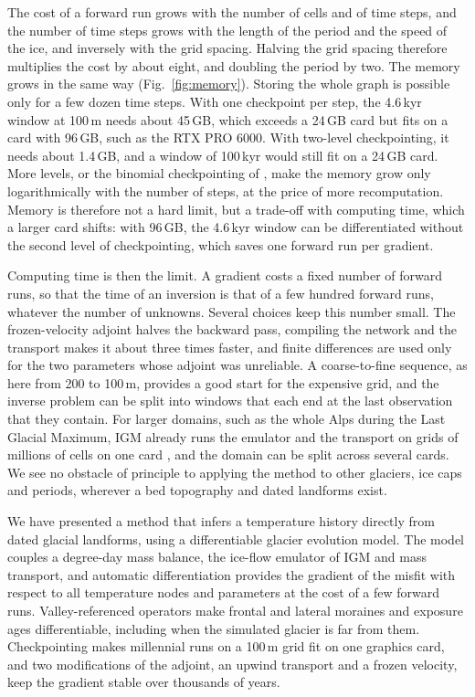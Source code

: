 \documentclass[tc, manuscript]{copernicus}
\begin{document}
The cost of a forward run grows with the number of cells and of time steps, and the number of time steps grows with the length of the period and the speed of the ice, and inversely with the grid spacing. Halving the grid spacing therefore multiplies the cost by about eight, and doubling the period by two. The memory grows in the same way (Fig.~\ref{fig:memory}). Storing the whole graph is possible only for a few dozen time steps. With one checkpoint per step, the 4.6\,kyr window at 100\,m needs about 45\,GB, which exceeds a 24\,GB card but fits on a card with 96\,GB, such as the RTX PRO 6000. With two-level checkpointing, it needs about 1.4\,GB, and a window of 100\,kyr would still fit on a 24\,GB card. More levels, or the binomial checkpointing of \citet{griewank2000}, make the memory grow only logarithmically with the number of steps, at the price of more recomputation. Memory is therefore not a hard limit, but a trade-off with computing time, which a larger card shifts: with 96\,GB, the 4.6\,kyr window can be differentiated without the second level of checkpointing, which saves one forward run per gradient.

Computing time is then the limit. A gradient costs a fixed number of forward runs, so that the time of an inversion is that of a few hundred forward runs, whatever the number of unknowns. Several choices keep this number small. The frozen-velocity adjoint halves the backward pass, compiling the network and the transport makes it about three times faster, and finite differences are used only for the two parameters whose adjoint was unreliable. A coarse-to-fine sequence, as here from 200 to 100\,m, provides a good start for the expensive grid, and the inverse problem can be split into windows that each end at the last observation that they contain. For larger domains, such as the whole Alps during the Last Glacial Maximum, IGM already runs the emulator and the transport on grids of millions of cells on one card \citep[e.g.][]{leger2025}, and the domain can be split across several cards. We see no obstacle of principle to applying the method to other glaciers, ice caps and periods, wherever a bed topography and dated landforms exist.


\conclusions
\label{sec:conclusions}

We have presented a method that infers a temperature history directly from dated glacial landforms, using a differentiable glacier evolution model. The model couples a degree-day mass balance, the ice-flow emulator of IGM and mass transport, and automatic differentiation provides the gradient of the misfit with respect to all temperature nodes and parameters at the cost of a few forward runs. Valley-referenced operators make frontal and lateral moraines and exposure ages differentiable, including when the simulated glacier is far from them. Checkpointing makes millennial runs on a 100\,m grid fit on one graphics card, and two modifications of the adjoint, an upwind transport and a frozen velocity, keep the gradient stable over thousands of years.
\end{document}
